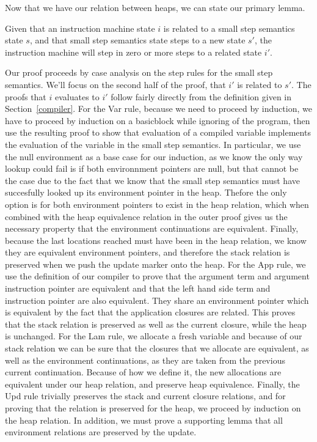 Now that we have our relation between heaps, we can state our primary lemma.
\begin{lemma} \label{lem:cesm_im}
Given that an instruction machine state $i$ is related to a small step
semantics state $s$, and that small step semantics state steps to a new state
$s'$, the instruction machine will step in zero or more steps to a related state
$i'$.
\end{lemma}
\begin{proofoutline}
Our proof proceeds by case analysis on the step rules for the small step
semantics. We'll focus on the second half of the proof, that $i'$ is related to
$s'$. The proofs that $i$ evaluates to $i'$ follow fairly directly from the
definition given in Section~\ref{compiler}. For the Var rule, because we need to
proceed by induction, we have to proceed by induction on a basicblock while
ignoring of the program, then use the resulting proof to show that evaluation of
a compiled variable implements the evaluation of the variable in the small step
semantics. In particular, we use the null environment as a base case for our
induction, as we know the only way lookup could fail is if both environnment
pointers are null, but that cannot be the case due to the fact that we know that
the small step semantics must have succesfully looked up its environment pointer
in the heap. Thefore the only option is for both environment pointers to exist
in the heap relation, which when combined with the heap equivalence relation in
the outer proof gives us the necessary property that the environment
continuations are equivalent. Finally, because the last locations reached must
have been in the heap relation, we know they are equivalent environment
pointers, and therefore the stack relation is preserved when we push the update
marker onto the heap. For the App rule, we use the definition of our compiler to
prove that the argument term and argument instruction pointer are equivalent and
that the left hand side term and instruction pointer are also equivalent. They
share an environment pointer which is equivalent by the fact that the
application closures are related. This proves that the stack relation is
preserved as well as the current closure, while the heap is unchanged. For the
Lam rule, we allocate a fresh variable and because of our stack relation we can
be sure that the closures that we allocate are equivalent, as well as the
environment continuations, as they are taken from the previous current
continuation. Because of how we define it, the new allocations are equivalent
under our heap relation, and preserve heap equivalence. Finally, the Upd rule
trivially preserves the stack and current closure relations, and for proving
that the relation is preserved for the heap, we proceed by induction on the heap
relation. In addition, we must prove a supporting lemma that all environment
relations are preserved by the update. 
\end{proofoutline}

